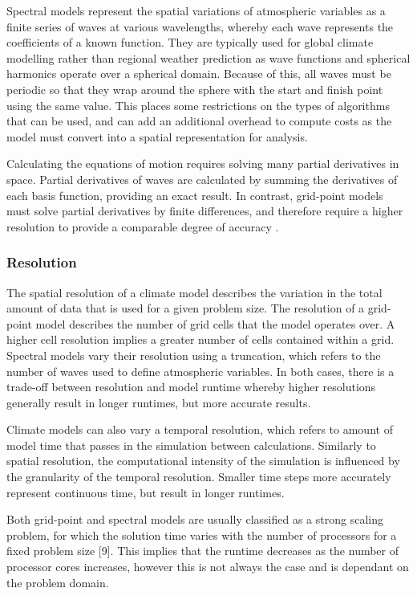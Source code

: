 \documentclass[a4paper,11pt]{report}
\begin{document}
\par
Spectral models represent the spatial variations of atmospheric variables as a finite series of waves at various wavelengths, whereby each wave represents the coefficients of a known function. They are typically used for global climate modelling rather than regional weather prediction as wave functions and spherical harmonics operate over a spherical domain. Because of this, all waves must be periodic so that they wrap around the sphere with the start and finish point using the same value. This places some restrictions on the types of algorithms that can be used, and can add an additional overhead to compute costs as the model must convert into a spatial representation for analysis. 
\par
Calculating the equations of motion requires solving many partial derivatives in space. Partial derivatives of waves are calculated by summing the derivatives of each basis function, providing an exact result. In contrast, grid-point models must solve partial derivatives by finite differences, and therefore require a higher resolution to provide a comparable degree of accuracy \cite{bart1998coordinate}. 

\subsubsection{Resolution} 
The spatial resolution of a climate model describes the variation in the total amount of data that is used for a given problem size. The resolution of a grid-point model describes the number of grid cells that the model operates over. A higher cell resolution implies a greater number of cells contained within a grid. Spectral models vary their resolution using a truncation, which refers to the number of waves used to define atmospheric variables. In both cases, there is a trade-off between resolution and model runtime whereby higher resolutions generally result in longer runtimes, but more accurate results. 
\par
Climate models can also vary a temporal resolution, which refers to amount of model time that passes in the simulation between calculations. Similarly to spatial resolution, the computational intensity of the simulation is influenced by the granularity of the temporal resolution. Smaller time steps more accurately represent continuous time, but result in longer runtimes.
\par
Both grid-point and spectral models are usually classified as a strong scaling problem, for which the solution time varies with the number of processors for a fixed problem size [9]. This implies that the runtime decreases as the number of processor cores increases, however this is not always the case and is dependant on the problem domain.
\end{document}
